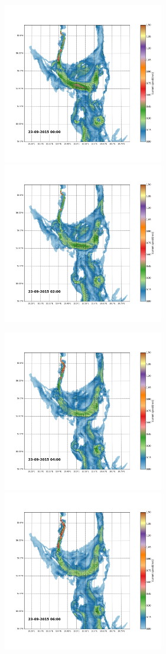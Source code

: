 \documentclass[12pt,a4paper,english]{article}
\begin{document}
\begin{figure}[h]
\centerline{
\includegraphics*[trim=2.0cm 3cm 6.0cm 3.5cm,clip=true,height=7cm]{Python/stromfelt_106}
\includegraphics*[trim=3.7cm 3cm 1.3cm 3.5cm,clip=true,height=7cm]{Python/stromfelt_108}
}
\centerline{
\includegraphics*[trim=2.0cm 3cm 6.0cm 3.5cm,clip=true,height=7cm]{Python/stromfelt_110}
\includegraphics*[trim=3.7cm 3cm 1.3cm 3.5cm,clip=true,height=7cm]{Python/stromfelt_112}
}
\end{figure}
\end{document}
